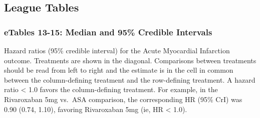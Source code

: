 \documentclass[
  12pt,
]{article}
\begin{document}
\begin{landscape}

\hypertarget{league-tables-2}{%
\subsection{League Tables}\label{league-tables-2}}

\hypertarget{etables-13-15-median-and-95-credible-intervals}{%
\subsubsection{eTables 13-15: Median and 95\% Credible
Intervals}\label{etables-13-15-median-and-95-credible-intervals}}

\begin{table}[!h]

\caption{\label{tab:unnamed-chunk-35}Acute Myocardial Infarction}
\centering
{}
\end{table}

Hazard ratios (95\% credible interval) for the Acute Myocardial
Infarction outcome. Treatments are shown in the diagonal. Comparisons
between treatments should be read from left to right and the estimate is
in the cell in common between the column-defining treatment and the
row-defining treatment. A hazard ratio \textless{} 1.0 favors the
column-defining treatment. For example, in the Rivaroxaban 5mg vs.~ASA
comparison, the corresponding HR (95\% CrI) was 0.90 (0.74, 1.10),
favoring Rivaroxaban 5mg (ie, HR \textless{} 1.0).

\end{landscape}
\end{document}
